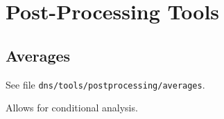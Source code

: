\chapter{Post-Processing Tools}\label{sec:postprocessing}

\section{Averages}

See file {\tt dns/tools/postprocessing/averages}.

Allows for conditional analysis.









